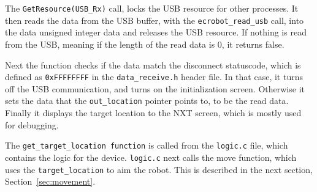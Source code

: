 The \texttt{GetResource(USB\_Rx)} call, locks the USB resource for other processes.
It then reads the data from the USB buffer, with the \texttt{ecrobot\_read\_usb} call, into the data unsigned integer data and releases the USB resource.
If nothing is read from the USB, meaning if the length of the read data is $0$, it returns false.

Next the function checks if the data match the disconnect statuscode, which is defined as \texttt{0xFFFFFFFF} in the \texttt{data\_receive.h} header file.
In that case, it turns off the USB communication, and turns on the initialization screen.
Otherwise it sets the data that the \texttt{out\_location} pointer points to, to be the read data.
Finally it displays the target location to the NXT screen, which is mostly used for debugging.

The \texttt{get\_target\_location function} is called from the \texttt{logic.c} file, which contains the logic for the device.
\texttt{logic.c} next calls the move function, which uses the \texttt{target\_location} to aim the robot.
This is described in the next section, Section~\ref{sec:movement}.

